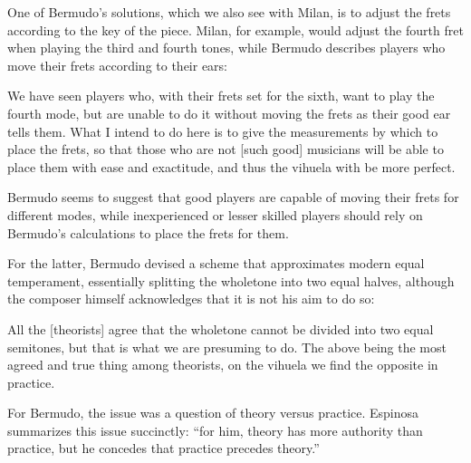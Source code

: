 One of Bermudo's solutions, which we also see with Milan, is to adjust the frets
according to the key of the piece. Milan, for example, would adjust the fourth fret
when playing the third and fourth tones, while Bermudo describes players who move their
frets according to their ears:
\begin{blocks}
We have seen players who, with their frets set for the sixth, want to play the fourth
mode, but are unable to do it without moving the frets as their good ear tells them.
What I intend to do here is to give the measurements by which to place the frets, so
that those who are not [such good] musicians will be able to place them with ease and
exactitude, and thus the vihuela with be more perfect.
\autocite[78]{DE:1}
\end{blocks}
Bermudo seems to suggest that good players are capable of moving their frets
for different modes, while inexperienced or lesser skilled players should
rely on Bermudo's calculations to place the frets for them.

For the latter, Bermudo devised a scheme that approximates modern equal temperament,
essentially splitting the wholetone into two equal halves, although the
composer himself acknowledges that it is not his aim to do so:
\begin{blocks}
All the [theorists] agree that the wholetone cannot be divided into two equal
semitones, but that is what we are presuming to do. The above being the most agreed
and true thing among theorists, on the vihuela we find the opposite in practice.
\autocite[xx]{DE:1}
\end{blocks}
For Bermudo, the issue was a question of theory versus practice. Espinosa summarizes
this issue succinctly: ``for him, theory has more authority than practice, but he
concedes that practice precedes theory.'' \autocite[xx]{DE:1}

